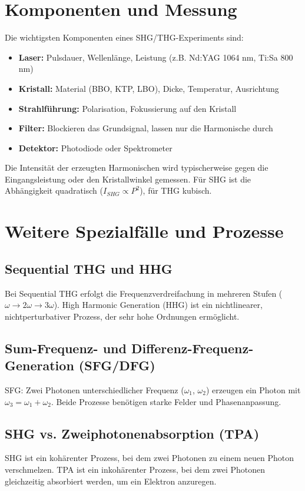 \documentclass[9pt,a4paper,twocolumn,twoside]{tau-class/tau}
\begin{document}

\section{Komponenten und Messung}
Die wichtigsten Komponenten eines SHG/THG-Experiments sind:
\begin{itemize}
    \item \textbf{Laser:} Pulsdauer, Wellenlänge, Leistung (z.B. Nd:YAG 1064 nm, Ti:Sa 800 nm)
    \item \textbf{Kristall:} Material (BBO, KTP, LBO), Dicke, Temperatur, Ausrichtung
    \item \textbf{Strahlführung:} Polarisation, Fokussierung auf den Kristall
    \item \textbf{Filter:} Blockieren das Grundsignal, lassen nur die Harmonische durch
    \item \textbf{Detektor:} Photodiode oder Spektrometer
\end{itemize}
Die Intensität der erzeugten Harmonischen wird typischerweise gegen die Eingangsleistung oder den Kristallwinkel gemessen. Für SHG ist die Abhängigkeit quadratisch ($I_{SHG} \propto P^2$), für THG kubisch.



\section{Weitere Spezialfälle und Prozesse}
\subsection{Sequential THG und HHG}
Bei Sequential THG erfolgt die Frequenzverdreifachung in mehreren Stufen ($\omega \rightarrow 2\omega \rightarrow 3\omega$). High Harmonic Generation (HHG) ist ein nichtlinearer, nichtperturbativer Prozess, der sehr hohe Ordnungen ermöglicht.

\subsection{Sum-Frequenz- und Differenz-Frequenz-Generation (SFG/DFG)}
SFG: Zwei Photonen unterschiedlicher Frequenz ($\omega_1$, $\omega_2$) erzeugen ein Photon mit $\omega_3 = \omega_1 + \omega_2$. Beide Prozesse benötigen starke Felder und Phasenanpassung.

\subsection{SHG vs. Zweiphotonenabsorption (TPA)}
SHG ist ein kohärenter Prozess, bei dem zwei Photonen zu einem neuen Photon verschmelzen. TPA ist ein inkohärenter Prozess, bei dem zwei Photonen gleichzeitig absorbiert werden, um ein Elektron anzuregen.
\end{document}
